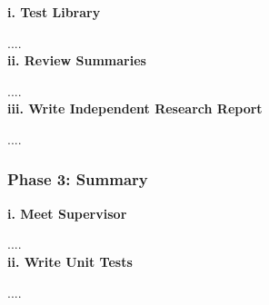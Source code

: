 \documentclass[12pt]{article}
\begin{document}
\textbf{i. Test Library}

.... \\

\textbf{ii. Review Summaries}

.... \\

\textbf{iii. Write Independent Research Report}

.... \\

\subsubsection{Phase 3: Summary}

\textbf{i. Meet Supervisor}

.... \\

\textbf{ii. Write Unit Tests}

.... \\



\pagebreak
\printbibliography
\end{document}
